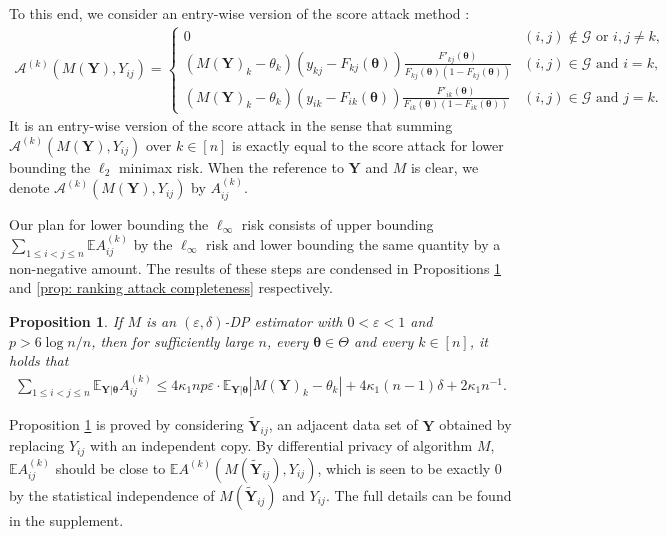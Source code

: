 \documentclass[letterpaper,12pt]{article}
\numberwithin{equation}{section}
\theoremstyle{plain}
\numberwithin{Theorem}{section}
\numberwithin{corollary}{section}
\newtheorem{proposition}{Proposition}
\numberwithin{proposition}{section}
\numberwithin{Lemma}{section}
{
	\theoremstyle{definition}
	\newtheorem{Definition}{Definition}
	\newtheorem{example}{Example}
	\numberwithin{example}{section}
	\newtheorem{fact}{Fact}
	\numberwithin{fact}{section}
	\newtheorem{remark}{Remark}
}
\newcommand{\1}{\mathbbm{1}}
\def\bth{{\boldsymbol{\theta}}}
\def\E{\mathbb{E}}
\begin{document}
To this end, we consider an entry-wise version of the score attack method \cite{cai2023score}:
\begin{align*}
	\mathcal A^{(k)}(M(\bm Y), Y_{ij}) = \begin{cases}
		0 &(i, j) \not\in \mathcal G \text{ or } i, j \neq k, \\
		(M(\bm Y)_k - \theta_k)(y_{kj} - F_{kj}(\bth))\frac{F'_{kj}(\bth)}{F_{kj}(\bth)(1 - F_{kj}(\bth))} &(i, j) \in \mathcal G \text{ and } i = k, \\
		(M(\bm Y)_k - \theta_k)(y_{ik} - F_{ik}(\bth))\frac{F'_{ik}(\bth)}{F_{ik}(\bth)(1 - F_{ik}(\bth))} &(i, j) \in \mathcal G \text{ and } j = k.
	\end{cases}
\end{align*}
It is an entry-wise version of the score attack in the sense that summing $\mathcal A^{(k)}(M(\bm Y), Y_{ij})$ over $k \in [n]$ is exactly equal to the score attack for lower bounding the $\ell_2$ minimax risk. When the reference to $\bm Y$ and $M$ is clear, we denote $	\mathcal A^{(k)}(M(\bm Y), Y_{ij})$ by $A^{(k)}_{ij}$.

Our plan for lower bounding the $\ell_\infty$ risk consists of upper bounding $\sum_{1 \leq i < j \leq n} \E A^{(k)}_{ij}$ by the $\ell_\infty$ risk and lower bounding the same quantity by a non-negative amount. The results of these steps are condensed in Propositions \ref{prop: ranking attack soundness} and \ref{prop: ranking attack completeness} respectively.

\begin{proposition}\label{prop: ranking attack soundness}
	If $M$ is an $(\varepsilon, \delta)$-DP estimator with $0 < \varepsilon < 1$ and $p > 6\log n/n$, then for sufficiently large $n$, every $\bth \in \Theta$ and every $k \in [n]$, it holds that
	\begin{align}\label{eq: ranking attack soundness}
		\sum_{1 \leq i < j \leq n} \E_{\bm Y|\bth} A^{(k)}_{ij} \leq 4\kappa_1 np\varepsilon \cdot \E_{\bm Y|\bth} |M(\bm Y)_k - \theta_k| + 4\kappa_1 (n-1)\delta+ 2\kappa_1 n^{-1} .
	\end{align} 
\end{proposition}

Proposition \ref{prop: ranking attack soundness} is proved by considering $\widetilde{\bm Y}_{ij}$, an adjacent data set of $\bm Y$ obtained by replacing $Y_{ij}$ with an independent copy. By differential privacy of algorithm $M$, $\E A^{(k)}_{ij}$ should be close to $\E A^{(k)}(M(\widetilde{\bm Y}_{ij}), Y_{ij})$, which is seen to be exactly 0 by the statistical independence of $M(\widetilde{\bm Y}_{ij})$ and $Y_{ij}$. The full details can be found in the supplement.
\end{document}
